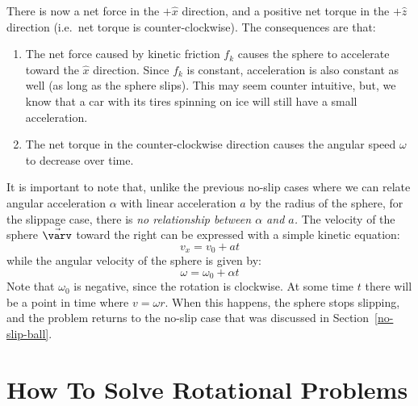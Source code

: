 \documentclass{../../oss-handout}
\newcommand{\xx}{\hat x}
\newcommand{\zz}{\hat z}
\begin{document}
There is now a net force in the $+\xx$ direction, and a positive net torque in
the $+\zz$ direction (i.e.\ net torque is counter-clockwise). The consequences
are that:
\begin{enumerate}[topsep=0pt]
\item The net force caused by kinetic friction $f_k$ causes the sphere to
  accelerate toward the $\xx$ direction. Since $f_k$ is constant, acceleration
  is also constant as well (as long as the sphere slips). This may seem counter
  intuitive, but, we know that a car with its tires spinning on ice will still
  have a small acceleration.
\item The net torque in the counter-clockwise direction causes the angular
  speed $\omega$ to decrease over time.
\end{enumerate}
It is important to note that, unlike the previous no-slip cases where we can 
relate angular acceleration $\alpha$ with linear acceleration $a$ by the radius
of the sphere, for the slippage case, there is \emph{no relationship between
  $\alpha$ and $a$.} The velocity of the sphere $\vec\varv$ toward the right can
be expressed with a simple kinetic equation:
\begin{equation}
  v_x=v_0+at
\end{equation}
while the angular velocity of the sphere is given by:
\begin{equation}
  \omega=\omega_0+\alpha t
\end{equation}
Note that $\omega_0$ is negative, since the rotation is clockwise. At some time
$t$ there will be a point in time where $v=\omega r$. When this happens, the
sphere stops slipping, and the problem returns to the no-slip case that was
discussed in Section~\ref{no-slip-ball}.


\section{How To Solve Rotational Problems}
\end{document}
